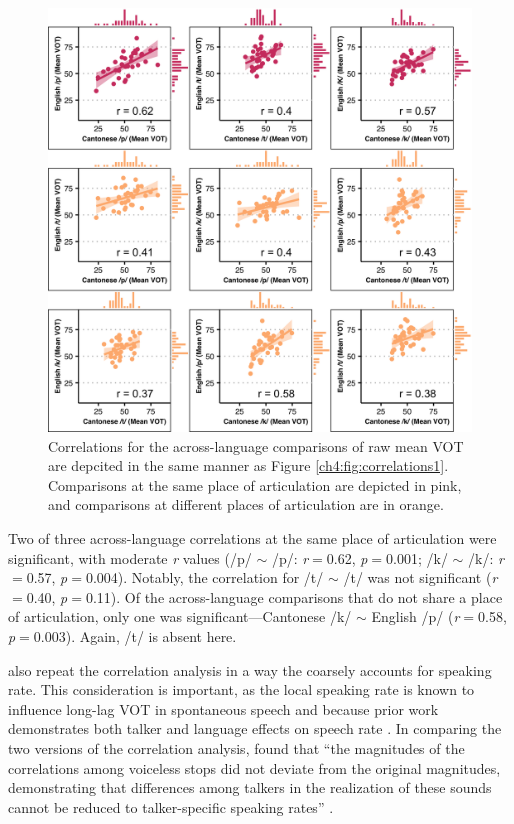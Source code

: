 \begin{figure}[htbp]
  \begin{center}
  \includegraphics[width=0.9\linewidth]{figures/ch4_correlations2_5in.png} 
  \caption{Correlations for the across-language comparisons of raw mean VOT are depcited in the same manner as Figure \ref{ch4:fig:correlations1}. Comparisons at the same place of articulation are depicted in pink, and comparisons at different places of articulation are in orange.} 
  \label{ch4:fig:correlations2}
  \end{center}
\end{figure}

Two of three across-language correlations at the same place of articulation were significant, with moderate \textit{r} values (/p/ $\sim$ /p/: \textit{r}$=$0.62, \textit{p}$=$0.001; /k/ $\sim$ /k/: \textit{r}$=$0.57, \textit{p}$=$0.004). Notably, the correlation for /t/ $\sim$ /t/ was not significant (\textit{r}$=$0.40, \textit{p}$=$0.11). Of the across-language comparisons that do not share a place of articulation, only one was significant---Cantonese /k/ $\sim$ English /p/ (\textit{r}$=$0.58, \textit{p}$=$0.003). Again, /t/ is absent here.

\citet{chodroff_2017_structure} also repeat the correlation analysis in a way the coarsely accounts for speaking rate. This consideration is important, as the local speaking rate is known to influence long-lag VOT in spontaneous speech \citep{stuartsmith_2015_private} and because prior work demonstrates both talker and language effects on speech rate \citep{bradlow_2017_rate}. In comparing the two versions of the correlation analysis, \citeauthor{chodroff_2017_structure} found that ``the magnitudes of the correlations among voiceless stops did not deviate from the original magnitudes, demonstrating that differences among talkers in the realization of these sounds cannot be reduced to talker-specific speaking rates'' \citeyearpar[][p. 34]{chodroff_2017_structure}. 

